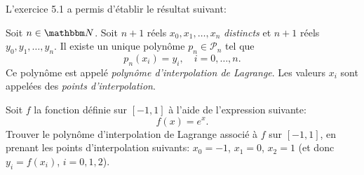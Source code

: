 \medskip

L'exercice 5.1 a permis d'établir le résultat suivant:

\begin{theorem}
Soit $n\in\eN$. Soit $n+1$ réels $x_0,x_1,\ldots,x_n$ \emph{distincts} et $n+1$ réels $y_0,y_1,\ldots,y_n$. Il existe un unique polynôme $p_n \in \mathcal{P}_n$ tel que
\begin{equation*} %
p_n(x_i)=y_i,\quad i=0,\ldots,n.
\end{equation*}
Ce polynôme est appelé \emph{polynôme d'interpolation de Lagrange}. Les valeurs $x_i$ sont appelées des \emph{points d'inter\-polation}.

\end{theorem}

\medskip

\begin{exercice}

Soit $f$ la fonction définie sur $[-1,1]$ à l'aide de l'expression suivante:
\[
f(x) = e^x.
\]
Trouver le polynôme d'interpolation de Lagrange associé à $f$ sur $[-1,1]$, en prenant les points d'interpolation suivants: $x_0=-1$, $x_1=0$, $x_2=1$ (et donc $y_i = f(x_i)$, $i=0,1,2$).

\end{exercice}

\medskip

